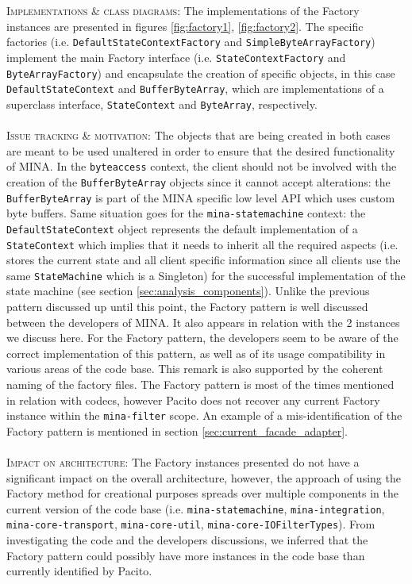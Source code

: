 \textsc{Implementations \& class diagrams}: The implementations of the Factory instances are presented in figures \ref{fig:factory1}, \ref{fig:factory2}. The specific factories (i.e. \texttt{DefaultStateContextFactory} and \texttt{SimpleByteArrayFactory}) implement the main Factory interface (i.e. \texttt{StateContextFactory} and \texttt{ByteArrayFactory}) and encapsulate the creation of specific objects, in this case \texttt{DefaultStateContext} and \texttt{BufferByteArray}, which are implementations of a superclass interface, \texttt{StateContext} and \texttt{ByteArray}, respectively. \\\\
\textsc{Issue tracking \& motivation}: The objects that are being created in both cases are meant to be used unaltered in order to ensure that the desired functionality of MINA. In the \texttt{byteaccess} context, the client should not be involved with the creation of the \texttt{BufferByteArray} objects since it cannot accept alterations: the \texttt{BufferByteArray} is part of the MINA specific low level API which uses custom byte buffers. Same situation goes for the \texttt{mina-statemachine} context: the \texttt{DefaultStateContext} object represents the default implementation of a \texttt{StateContext} which implies that it needs to inherit all the required aspects (i.e. stores the current state and all client specific information since all clients use the same \texttt{StateMachine} which is a Singleton) for the successful implementation of the state machine (see section \ref{sec:analysis_components}). Unlike the previous pattern discussed up until this point, the Factory pattern is well discussed between the developers of MINA. It also appears in relation with the 2 instances we discuss here. For the Factory pattern, the developers seem to be aware of the correct implementation of this pattern, as well as of its usage compatibility in various areas of the code base. This remark is also supported by the coherent naming of the factory files. The Factory pattern is most of the times mentioned in relation with codecs, however Pacito does not recover any current Factory instance within the \texttt{mina-filter} scope. An example of a mis-identification of the Factory pattern is mentioned in section \ref{sec:current_facade_adapter}.\\\\
\textsc{Impact on architecture}: The Factory instances presented do not have a significant impact on the overall architecture, however, the approach of using the Factory method for creational purposes spreads over multiple components in the current version of the code base (i.e. \texttt{mina-statemachine}, \texttt{mina-integration}, \texttt{mina-core-transport}, \texttt{mina-core-util}, \texttt{mina-core-IOFilterTypes}). From investigating the code and the developers discussions, we inferred that the Factory pattern could possibly have more instances in the code base than currently identified by Pacito.\\\\
